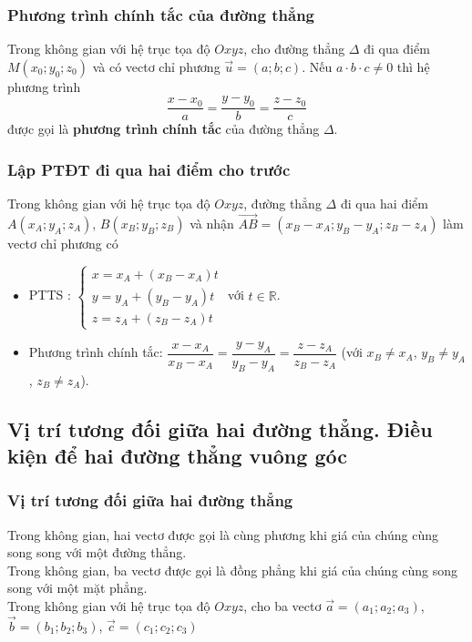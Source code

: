 \subsubsection{Phương trình chính tắc của đường thẳng}

 Trong không gian với hệ trục tọa độ $Oxyz$, cho đường thẳng $\Delta $ đi qua điểm $M(x_{0} ;y_{0} ;z_{0} )$ và có vectơ chỉ phương $\overrightarrow{u}=(a;b;c)$. Nếu $a\cdot b\cdot c\ne 0$ thì hệ phương trình $$\dfrac{x-x_{0} }{a} =\dfrac{y-y_{0} }{b} =\dfrac{z-z_{0} }{c} $$ được gọi là \textbf{phương trình chính tắc} của đường thẳng $\Delta $.


\subsubsection{Lập PTĐT đi qua hai điểm cho trước}

 Trong không gian với hệ trục tọa độ $Oxyz$, đường thẳng $\Delta $ đi qua hai điểm $A(x_{A} ;y_{A} ;z_{A} )$, $B(x_{B} ;y_{B} ;z_{B} )$ và nhận $\overrightarrow{AB}=(x_{B} -x_{A} ;y_{B} -y_{A} ;z_{B} -z_{A} )$ làm vectơ chỉ phương có
\begin{itemize}
	\item  PTTS : $\left\{\begin{array}{l} {x=x_{A} +(x_{B} -x_{A} )t} \\ {y=y_{A} +(y_{B} -y_{A} )t} \\ {z=z_{A} +(z_{B} -z_{A} )t} \end{array}\right. $ với $t\in  \mathbb{R}$.
	\item  Phương trình chính tắc: $\dfrac{x-x_{A} }{x_{B} -x_{A} } =\dfrac{y-y_{A} }{y_{B} -y_{A} } =\dfrac{z-z_{A} }{z_{B} -z_{A} } $ (với $x_{B} \ne x_{A}$, $y_{B} \ne y_{A}$, $z_{B} \ne z_{A} $).
\end{itemize}

 \subsection{Vị trí tương đối giữa hai đường thẳng. Điều kiện để hai đường thẳng vuông góc}
\subsubsection{Vị trí tương đối giữa hai đường thẳng}

 Trong không gian, hai vectơ được gọi là cùng phương khi giá của chúng cùng song song với một đường thẳng.\\
 Trong không gian, ba vectơ được gọi là đồng phẳng khi giá của chúng cùng song song với một mặt phẳng.\\
 Trong không gian với hệ trục tọa độ $Oxyz$, cho ba vectơ $\overrightarrow{a}=(a_{1} ;a_{2} ;a_{3} )$, $\overrightarrow{b}=(b_{1} ;b_{2} ;b_{3} )$, $\overrightarrow{c}=(c_{1} ;c_{2} ;c_{3} )$

